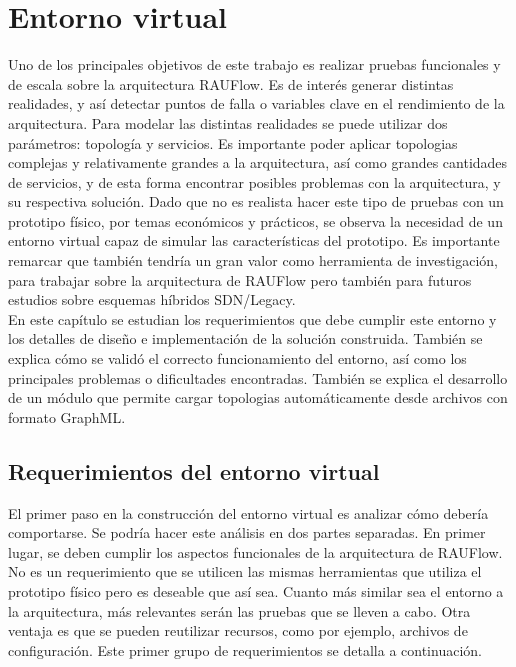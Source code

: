 \chapter{Entorno virtual}

\graphicspath{{Chapter3/Figs/}}

Uno de los principales objetivos de este trabajo es realizar pruebas funcionales y de escala sobre la arquitectura RAUFlow. Es de interés generar distintas realidades, y así detectar puntos de falla o variables clave en el rendimiento de la arquitectura. Para modelar las distintas realidades se puede utilizar dos parámetros: topología y servicios. Es importante poder aplicar topologias complejas y relativamente grandes a la arquitectura, así como grandes cantidades de servicios, y de esta forma encontrar posibles problemas con la arquitectura, y su respectiva solución. Dado que no es realista hacer este tipo de pruebas con un prototipo físico, por temas económicos y prácticos, se observa la necesidad de un entorno virtual capaz de simular las características del prototipo. Es importante remarcar que también tendría un gran valor como herramienta de investigación, para trabajar sobre la arquitectura de RAUFlow pero también para futuros estudios sobre esquemas híbridos SDN/Legacy. \\
En este capítulo se estudian los requerimientos que debe cumplir este entorno y los detalles de diseño e implementación de la solución construida. También se explica cómo se validó el correcto funcionamiento del entorno, así como los principales problemas o dificultades encontradas. También se explica el desarrollo de un módulo que permite cargar topologias automáticamente desde archivos con formato GraphML.

\section{Requerimientos del entorno virtual}
El primer paso en la construcción del entorno virtual es analizar cómo debería comportarse. Se podría hacer este análisis en dos partes separadas. En primer lugar, se deben cumplir los aspectos funcionales de la arquitectura de RAUFlow. No es un requerimiento que se utilicen las mismas herramientas que utiliza el prototipo físico pero es deseable que así sea. Cuanto más similar sea el entorno a la arquitectura, más relevantes serán las pruebas que se lleven a cabo. Otra ventaja es que se pueden reutilizar recursos, como por ejemplo, archivos de configuración. Este primer grupo de requerimientos se detalla a continuación.

